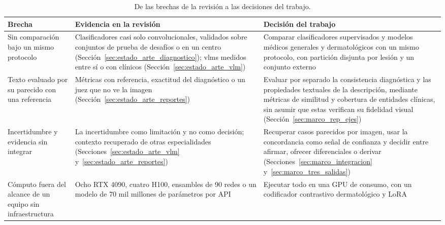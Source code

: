 \begin{table}[H]
    \centering
    \caption{De las brechas de la revisión a las decisiones del trabajo.}
    \label{tab:marco_brechas}
    \small
    \begin{tabularx}{\textwidth}{@{}>{\raggedright\arraybackslash}p{3.3cm}
        >{\raggedright\arraybackslash\hspace{0pt}}X >{\raggedright\arraybackslash\hspace{0pt}}X@{}}
        \toprule
        \textbf{Brecha} & \textbf{Evidencia en la revisión} & \textbf{Decisión del trabajo} \\
        \midrule
        Sin comparación bajo un mismo protocolo
            & Clasificadores casi solo convolucionales, validados sobre conjuntos de prueba de desafíos o en un centro
              (Sección~\ref{sec:estado_arte_diagnostico}); \glspl{vlm} medidos entre sí o con clínicos
              (Sección~\ref{sec:estado_arte_vlm})
            & Comparar clasificadores supervisados y modelos médicos generales y dermatológicos con un mismo
              protocolo, con partición disjunta por lesión y un conjunto externo \\
        \filasep
        Texto evaluado por su parecido con una referencia
            & Métricas con referencia, exactitud del diagnóstico o un juez que no ve la imagen
              (Sección~\ref{sec:estado_arte_reportes})
            & Evaluar por separado la consistencia diagnóstica y las propiedades textuales de la descripción, mediante
              métricas de similitud y cobertura de entidades clínicas, sin asumir que estas verifican su fidelidad
              visual (Sección~\ref{sec:marco_rep_ejes}) \\
        \filasep
        Incertidumbre y evidencia sin integrar
            & La incertidumbre como limitación y no como decisión; contexto recuperado de otras especialidades
              (Secciones~\ref{sec:estado_arte_vlm} y~\ref{sec:estado_arte_reportes})
            & Recuperar casos parecidos por imagen, usar la concordancia como señal de confianza y decidir entre
              afirmar, ofrecer diferenciales o derivar
              (Secciones~\ref{sec:marco_integracion} y~\ref{sec:marco_tres_salidas}) \\
        \filasep
        Cómputo fuera del alcance de un equipo sin infraestructura
            & Ocho RTX 4090, cuatro H100, ensambles de 90 redes o un modelo de 70 mil millones de parámetros
              por API
            & Ejecutar todo en una GPU de consumo, con un codificador contrastivo dermatológico y LoRA \\
        \bottomrule
    \end{tabularx}
\end{table}

\FloatBarrier
